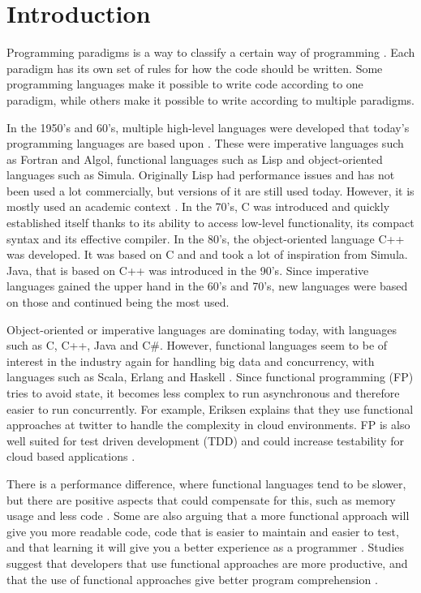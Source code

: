 \documentclass {article}
\begin{document}
\newpage
\section{Introduction}
Programming paradigms is a way to classify a certain way of programming \cite{programming-paradigms}. Each paradigm has its own set of rules for how the code should be written. Some programming languages make it possible to write code according to one paradigm,  while others make it possible to write according to multiple paradigms. 
 
In the 1950's and 60's, multiple high-level languages were developed that today's programming languages are based upon \cite{gabmar}. These were imperative languages such as Fortran and Algol, functional languages such as Lisp and object-oriented languages such as Simula. Originally Lisp had performance issues and has not been used a lot commercially, but versions of it are still used today. However, it is mostly used an academic context \cite{gabmar, alomgi}. In the 70's, C was introduced and quickly established itself thanks to its ability to access low-level functionality, its compact syntax and its effective compiler. In the 80's, the object-oriented language C++ was developed. It was based on C and and took a lot of inspiration from Simula. Java, that is based on C++ was introduced in the 90's. Since imperative languages gained the upper hand in the 60's and 70's, new languages were based on those and continued being the most used. 
 
Object-oriented or imperative languages are dominating today, with languages such as C, C++, Java and C\#. However, functional languages seem to be of interest in the industry again for handling big data and concurrency, with languages such as Scala, Erlang and Haskell \cite{drboolean, eriksen, erikarl, alomgi}. Since functional programming (FP) tries to avoid state, it becomes less complex to run asynchronous and therefore easier to run concurrently. For example, Eriksen \cite{eriksen} explains that they use functional approaches at twitter to handle the complexity in cloud environments. FP is also well suited for test driven development (TDD) and could increase testability for cloud based applications \cite{benrad}. 
 
There is a performance difference, where functional languages tend to be slower, but there are positive aspects that could compensate for this, such as memory usage and less code \cite{fogus, alomgi}. Some are also arguing that a more functional approach will give you more readable code, code that is easier to maintain and easier to test, and that learning it will give you a better experience as a programmer \cite{drboolean, meijer}. Studies suggest that developers that use functional approaches are more productive, and that the use of functional approaches give better program comprehension \cite{saproamname, scomad}. 
 
\end{document}
